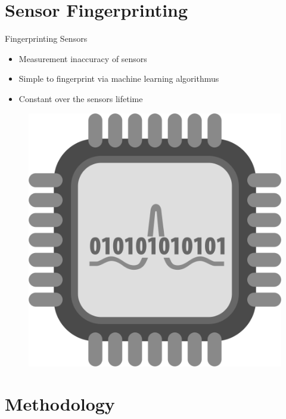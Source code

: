 \documentclass[aspectratio=169]{beamer}
[aspectratio=169] %
\begin{document}
\section{Sensor Fingerprinting}

\begin{frame}{Fingerprinting Sensors}
  \begin{minipage}{0.49\textwidth} 
    \begin{itemize}
      \item Measurement inaccuracy of sensors
      \pause
      \item Simple to fingerprint via machine learning algorithmus
      \pause
      \item Constant over the sensors lifetime
    \end{itemize}
  \end{minipage}
  \hfill
  \begin{minipage}{0.49\textwidth}
    \begin{figure}
      \centering
      \includegraphics[height=0.5\textheight]{figures/analog.png}
    \end{figure}
  \end{minipage}
\end{frame}


\section{Methodology}
\end{document}

